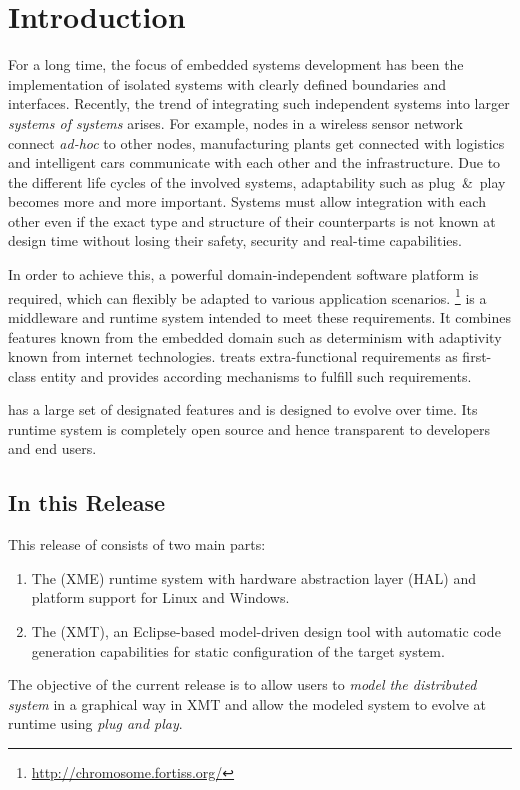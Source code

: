 %
% 
%
%
%

\section{Introduction} \label{sec:intro}

For a long time, the focus of embedded systems development has been the implementation of isolated systems with clearly defined boundaries and interfaces.
Recently, the trend of integrating such independent systems into larger \emph{systems of systems} arises.
For example, nodes in a wireless sensor network connect \textit{ad-hoc} to other nodes, manufacturing plants get connected with logistics
and intelligent cars communicate with each other and the infrastructure.
Due to the different life cycles of the involved systems, adaptability such as plug~\&~play becomes more and more important.
Systems must allow integration with each other even if the exact type and structure of their counterparts is not known at design time
without losing their safety, security and real-time capabilities.

In order to achieve this, a powerful domain-independent software platform is required,
which can flexibly be adapted to various application scenarios.
\xme\footnote{\url{http://chromosome.fortiss.org/}} is a middleware and runtime system intended to meet these requirements.
It combines features known from the embedded domain such as determinism with adaptivity known from internet technologies.
\xme treats extra-functional requirements as first-class entity and provides according mechanisms to fulfill such requirements.

\xme has a large set of designated features and is designed to evolve over time.
Its runtime system is completely open source and hence transparent to developers and end users.

\subsection{In this Release}

This release of \xme consists of two main parts:
\begin{enumerate}
	\item The \xme (XME) runtime system with hardware abstraction layer (HAL) and platform support for Linux and Windows.
	\item The \xmt (XMT), an Eclipse-based model-driven design tool with automatic code generation capabilities for static configuration of the target system.
\end{enumerate}
The objective of the current release is to allow users to \emph{model the distributed system} in a graphical way in XMT
and allow the modeled system to evolve at runtime using \emph{plug and play}.

